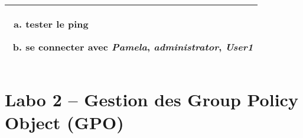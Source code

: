 \documentclass[a4paper]{article}
\begin{document}
\begin{center}
\begin{tabular}{|p{5cm}|p{5cm}|p{5cm}|}
        \\ \hline

        \multicolumn{3}{|p{15cm}|}{
            \begin{enumerate}[(a)]
                \item tester le ping
                \item se connecter avec \textit{Pamela}, \textit{administrator}, \textit{User1}
            \end{enumerate}
        }

        \\ \hline

    \end{tabular}
\end{center}















\section{Labo 2 -- Gestion des Group Policy Object (GPO)}
\end{document}
